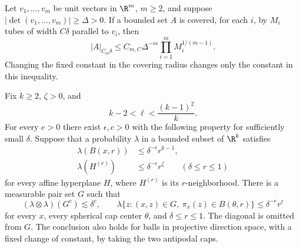 \begin{lemma}\label{ang:loomis-whitney}
Let $v_1,\ldots,v_m$ be unit vectors in $\R^m$, $m\ge2$, and suppose
$|\det(v_1,\ldots,v_m)|\ge\Delta>0$. If a bounded set $A$ is covered,
for each $i$, by $M_i$ tubes of width $C\delta$ parallel to $v_i$, then
\[
 |A|_{C_m\delta}\le C_{m,C}\Delta^{-m}
       \prod_{i=1}^m M_i^{1/(m-1)}.
\]
Changing the fixed constant in the covering radius changes only the
constant in this inequality.
\end{lemma}

\begin{lemma}\label{ang:weak-radial}
Fix $k\ge2$, $\zeta>0$, and
\[
 k-2<\ell<\frac{(k-1)^2}{k}.
\]
For every $e>0$ there exist $\epsilon,c>0$ with the following property
for sufficiently small $\delta$. Suppose that a probability $\lambda$
in a bounded subset of $\R^k$ satisfies
\begin{align*}
 \lambda(B(x,r))&\le\delta^{-\epsilon}r^{k-1},\\
 \lambda(H^{(r)})&\le\delta^{-\epsilon}r^\zeta
 \qquad(\delta\le r\le1)
\end{align*}
for every affine hyperplane $H$, where $H^{(r)}$ is its $r$-neighborhood.
There is a measurable pair set $G$ such that
\[
 (\lambda\otimes\lambda)(G^c)\lesssim\delta^c,
 \qquad
 \lambda\{z:(x,z)\in G,\ \pi_x(z)\in B(\theta,r)\}
       \le\delta^{-e}r^\ell
\]
for every $x$, every spherical cap center $\theta$, and
$\delta\le r\le1$. The diagonal is omitted from $G$. The conclusion
also holds for balls in projective direction space, with a fixed change
of constant, by taking the two antipodal caps.
\end{lemma}
